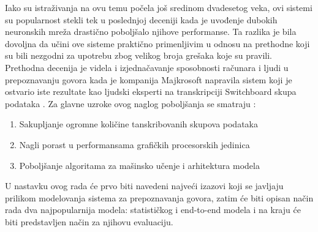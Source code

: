 \documentclass[a4paper]{article}
\begin{document}
Iako su istraživanja na ovu temu počela još sredinom dvadesetog veka, ovi sistemi su popularnost stekli tek u poslednjoj deceniji kada je uvođenje dubokih neuronskih mreža drastično poboljšalo njihove performanse.
Ta razlika je bila dovoljna da učini ove sisteme praktično primenljivim u odnosu na prethodne koji su bili nezgodni za upotrebu zbog velikog broja grešaka koje su pravili.
Prethodna decenija je videla i izjednačavanje sposobnosti računara i ljudi u prepoznavanju govora kada je kompanija Majkrosoft napravila sistem koji je ostvario iste rezultate kao ljudski eksperti na transkripciji Switchboard skupa podataka \cite{switchboard}.
Za glavne uzroke ovog naglog poboljšanja se smatraju \cite{hannun2021history}:
\begin{enumerate}
  \item Sakupljanje ogromne količine tanskribovanih skupova podataka
  \item Nagli porast u performansama grafičkih procesorskih jedinica
  \item Poboljšanje algoritama za mašinsko učenje i arhitektura modela
\end{enumerate}

U nastavku ovog rada će prvo biti navedeni najveći izazovi koji se javljaju prilikom modelovanja sistema za prepoznavanja govora, zatim će biti opisan način rada dva najpopularnija modela: statističkog i end-to-end modela i na kraju će biti predstavljen način za njihovu evaluaciju.
\end{document}
